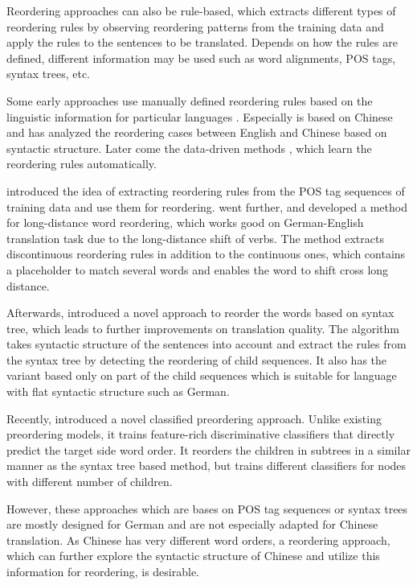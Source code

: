 \documentclass[a4paper]{article}
\begin{document}
Reordering approaches can also be rule-based, which extracts different types of reordering rules by observing reordering patterns from the training data and apply the rules to the sentences to be translated. Depends on how the rules are defined, different information may be used such as word alignments, POS tags, syntax trees, etc.

Some early approaches use manually defined reordering rules based on the linguistic information for particular languages \cite{collins2005clause, popovic2006pos,habash2007syntactic}. Especially \cite{syntactic} is based on Chinese and has analyzed the reordering cases between English and Chinese based on syntactic structure. Later come the data-driven methods \cite{zhang2007chunk, crego2008using}, which learn the reordering rules automatically. 

\cite{short} introduced the idea of extracting reordering rules from the POS tag sequences of training data and use them for reordering. \cite{long} went further, and developed a method for long-distance word reordering, which works good on German-English translation task due to the long-distance shift of verbs. The method extracts discontinuous reordering rules in addition to the continuous ones, which contains a placeholder to match several words and enables the word to shift cross long distance.

Afterwards, \cite{tree} introduced a novel approach to reorder the words based on syntax tree, which leads to further improvements on translation quality. The algorithm takes syntactic structure of the sentences into account and extract the rules from the syntax tree by detecting the reordering of child sequences. It also has the variant based only on part of the child sequences which is suitable for language with flat syntactic structure such as German.

Recently, \cite{google} introduced a novel classified preordering approach. Unlike existing preordering models, it trains feature-rich discriminative classifiers that directly predict the target side word order. It reorders the children in subtrees in a similar manner as the syntax tree based method, but trains different classifiers for nodes with different number of children.

However, these approaches which are bases on POS tag sequences or syntax trees are mostly designed for German and are not especially adapted for Chinese translation. As Chinese has very different word orders, a reordering approach, which can further explore the syntactic structure of Chinese and utilize this information for reordering, is desirable.
\end{document}
